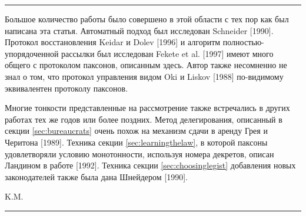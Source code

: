 \documentclass[12pt, a4paper]{article} %
\begin{document}
\noindent\rule{\textwidth}{0.4pt}
{\color{gray}
Большое количество работы было совершено в этой области с тех пор как был написана эта статья. Автоматный подход был исследован Schneider [1990]. Протокол восстановления Keidar и Dolev [1996] и алгоритм полностью-упорядоченной рассылки был исследован Fekete et al. [1997] имеют много общего с протоколом паксонов, описанным здесь. Автор также несомненно не знал о том, что протокол управления видом Oki и Liskov [1988] по-видимому эквивалентен протоколу паксонов.

Многие тонкости представленные на рассмотрение также встречались в других работах тех же годов или более поздних. Метод делегирования, описанный в секции \ref{sec:bureaucrats} очень похож на механизм сдачи в аренду Грея и Черитона [1989].  Техника секции \ref{sec:learningthelaw}, в которой паксоны удовлетворяли условию монотонности, используя номера декретов, описан Ландином в работе [1992].  Техника секции \ref{sec:choosinglegist} добавления новых законодателей также была дана Шнейдером [1990].\\
\begin{flushright}
    K.M.
\end{flushright}
}
\noindent\rule{\textwidth}{0.4pt}
\end{document}
